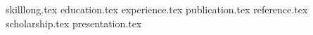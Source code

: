 \documentclass[11pt, a4paper]{awesome-cv}
\newcommand*{\sectiondir}{resume/}
\begin{document}
\makecvheader    
   
{skilllong.tex}
{education.tex}
{experience.tex}
{publication.tex}
{reference.tex}
{scholarship.tex}
{presentation.tex}
        
\end{document}
